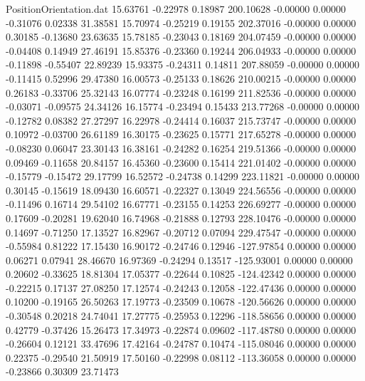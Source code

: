 \begin{filecontents}{PositionOrientation.dat}
  15.63761   -0.22978    0.18987   200.10628   -0.00000    0.00000   -0.31076    0.02338   31.38581
  15.70974   -0.25219    0.19155   202.37016   -0.00000    0.00000    0.30185   -0.13680   23.63635
  15.78185   -0.23043    0.18169   204.07459   -0.00000    0.00000   -0.04408    0.14949   27.46191
  15.85376   -0.23360    0.19244   206.04933   -0.00000    0.00000   -0.11898   -0.55407   22.89239
  15.93375   -0.24311    0.14811   207.88059   -0.00000    0.00000   -0.11415    0.52996   29.47380
  16.00573   -0.25133    0.18626   210.00215   -0.00000    0.00000    0.26183   -0.33706   25.32143
  16.07774   -0.23248    0.16199   211.82536   -0.00000    0.00000   -0.03071   -0.09575   24.34126
  16.15774   -0.23494    0.15433   213.77268   -0.00000    0.00000   -0.12782    0.08382   27.27297
  16.22978   -0.24414    0.16037   215.73747   -0.00000    0.00000    0.10972   -0.03700   26.61189
  16.30175   -0.23625    0.15771   217.65278   -0.00000    0.00000   -0.08230    0.06047   23.30143
  16.38161   -0.24282    0.16254   219.51366   -0.00000    0.00000    0.09469   -0.11658   20.84157
  16.45360   -0.23600    0.15414   221.01402   -0.00000    0.00000   -0.15779   -0.15472   29.17799
  16.52572   -0.24738    0.14299   223.11821   -0.00000    0.00000    0.30145   -0.15619   18.09430
  16.60571   -0.22327    0.13049   224.56556   -0.00000    0.00000   -0.11496    0.16714   29.54102
  16.67771   -0.23155    0.14253   226.69277   -0.00000    0.00000    0.17609   -0.20281   19.62040
  16.74968   -0.21888    0.12793   228.10476   -0.00000    0.00000    0.14697   -0.71250   17.13527
  16.82967   -0.20712    0.07094   229.47547   -0.00000    0.00000   -0.55984    0.81222   17.15430
  16.90172   -0.24746    0.12946  -127.97854    0.00000    0.00000    0.06271    0.07941   28.46670
  16.97369   -0.24294    0.13517  -125.93001    0.00000    0.00000    0.20602   -0.33625   18.81304
  17.05377   -0.22644    0.10825  -124.42342    0.00000    0.00000   -0.22215    0.17137   27.08250
  17.12574   -0.24243    0.12058  -122.47436    0.00000    0.00000    0.10200   -0.19165   26.50263
  17.19773   -0.23509    0.10678  -120.56626    0.00000    0.00000   -0.30548    0.20218   24.74041
  17.27775   -0.25953    0.12296  -118.58656    0.00000    0.00000    0.42779   -0.37426   15.26473
  17.34973   -0.22874    0.09602  -117.48780    0.00000    0.00000   -0.26604    0.12121   33.47696
  17.42164   -0.24787    0.10474  -115.08046    0.00000    0.00000    0.22375   -0.29540   21.50919
  17.50160   -0.22998    0.08112  -113.36058    0.00000    0.00000   -0.23866    0.30309   23.71473

\end{filecontents}
